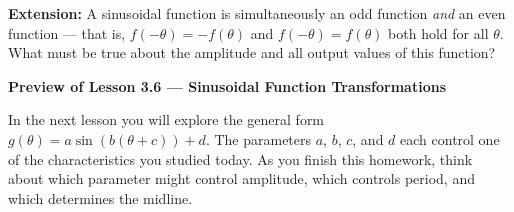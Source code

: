 \documentclass[10pt]{article}
\begin{document}
\vspace{0.08in}

\begin{extensionbox}
\textbf{Extension:} A sinusoidal function is simultaneously an odd function
\textit{and} an even function --- that is, $f(-\theta) = -f(\theta)$ and
$f(-\theta) = f(\theta)$ both hold for all $\theta$.  What must be true about
the amplitude and all output values of this function?

\end{extensionbox}

\vspace{0.08in}

\begin{tcolorbox}[colback=goldbg, colframe=goldacc, arc=2mm,
    left=3mm, right=3mm, top=2mm, bottom=2mm]
\textbf{Preview of Lesson 3.6 --- Sinusoidal Function Transformations}

In the next lesson you will explore the general form
$g(\theta) = a\sin(b(\theta + c)) + d$.
The parameters $a$, $b$, $c$, and $d$ each control one of the characteristics
you studied today. As you finish this homework, think about which parameter
might control amplitude, which controls period, and which determines the midline.
\end{tcolorbox}
\end{document}
